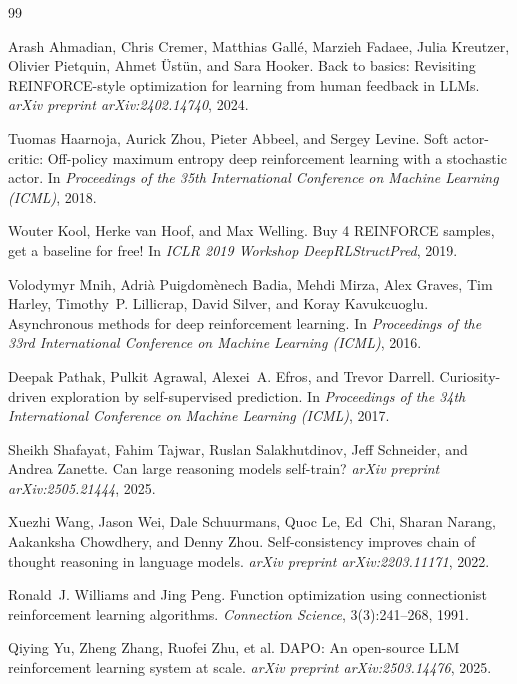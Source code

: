 \documentclass{article}
\begin{document}
\begin{thebibliography}{99}

Arash Ahmadian, Chris Cremer, Matthias Gall\'{e}, Marzieh Fadaee, Julia
Kreutzer, Olivier Pietquin, Ahmet \"{U}st\"{u}n, and Sara Hooker.
\newblock Back to basics: Revisiting REINFORCE-style optimization for
learning from human feedback in LLMs.
\newblock \emph{arXiv preprint arXiv:2402.14740}, 2024.

Tuomas Haarnoja, Aurick Zhou, Pieter Abbeel, and Sergey Levine.
\newblock Soft actor-critic: Off-policy maximum entropy deep reinforcement
learning with a stochastic actor.
\newblock In \emph{Proceedings of the 35th International Conference on
Machine Learning (ICML)}, 2018.

Wouter Kool, Herke van Hoof, and Max Welling.
\newblock Buy 4 REINFORCE samples, get a baseline for free!
\newblock In \emph{ICLR 2019 Workshop DeepRLStructPred}, 2019.

Volodymyr Mnih, Adri\`{a} Puigdom\`{e}nech Badia, Mehdi Mirza, Alex Graves,
Tim Harley, Timothy~P. Lillicrap, David Silver, and Koray Kavukcuoglu.
\newblock Asynchronous methods for deep reinforcement learning.
\newblock In \emph{Proceedings of the 33rd International Conference on
Machine Learning (ICML)}, 2016.

Deepak Pathak, Pulkit Agrawal, Alexei~A. Efros, and Trevor Darrell.
\newblock Curiosity-driven exploration by self-supervised prediction.
\newblock In \emph{Proceedings of the 34th International Conference on
Machine Learning (ICML)}, 2017.

Sheikh Shafayat, Fahim Tajwar, Ruslan Salakhutdinov, Jeff Schneider, and
Andrea Zanette.
\newblock Can large reasoning models self-train?
\newblock \emph{arXiv preprint arXiv:2505.21444}, 2025.

Xuezhi Wang, Jason Wei, Dale Schuurmans, Quoc Le, Ed~Chi, Sharan Narang,
Aakanksha Chowdhery, and Denny Zhou.
\newblock Self-consistency improves chain of thought reasoning in language
models.
\newblock \emph{arXiv preprint arXiv:2203.11171}, 2022.

Ronald~J. Williams and Jing Peng.
\newblock Function optimization using connectionist reinforcement learning
algorithms.
\newblock \emph{Connection Science}, 3(3):241--268, 1991.

Qiying Yu, Zheng Zhang, Ruofei Zhu, et al.
\newblock DAPO: An open-source LLM reinforcement learning system at scale.
\newblock \emph{arXiv preprint arXiv:2503.14476}, 2025.

\end{thebibliography}
\end{document}
